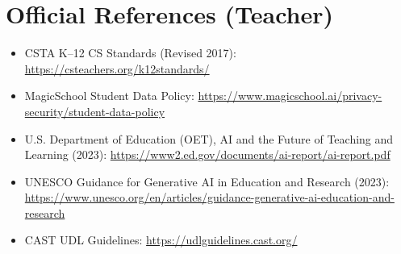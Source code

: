 \documentclass[11pt]{article}
\newcommand{\Session}[1]{\section*{#1}}
\begin{document}
\newpage
\Session{Official References (Teacher)}
\begin{itemize}[leftmargin=*]
  \item CSTA K--12 CS Standards (Revised 2017): \url{https://csteachers.org/k12standards/}
  \item MagicSchool Student Data Policy: \url{https://www.magicschool.ai/privacy-security/student-data-policy}
  \item U.S. Department of Education (OET), AI and the Future of Teaching and Learning (2023): \url{https://www2.ed.gov/documents/ai-report/ai-report.pdf}
  \item UNESCO Guidance for Generative AI in Education and Research (2023): \url{https://www.unesco.org/en/articles/guidance-generative-ai-education-and-research}
  \item CAST UDL Guidelines: \url{https://udlguidelines.cast.org/}
\end{itemize}
\end{document}
